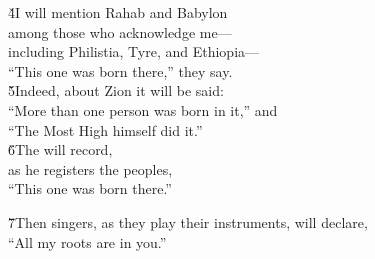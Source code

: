 \begin{poetry}
\poeml \v{4}I will mention Rahab and Babylon \\
\poemll    among those who acknowledge me--- \\
\poeml including Philistia, Tyre, and Ethiopia--- \\
\poemll    ``This one was born there,'' they say. \\
\poeml \v{5}Indeed, about Zion it will be said: \\
\poemll    ``More than one person was born in it,'' and \\
\poemlll       ``The Most High himself did it.'' \\
\poeml \v{6}The  will record, \\
\poemll    as he registers the peoples, \\
\poemlll       ``This one was born there.''
\end{poetry}

\begin{poetry}
\poeml \v{7}Then singers, as they play their instruments, will declare, \\
\poemll    ``All my roots are in you.''
\end{poetry}

